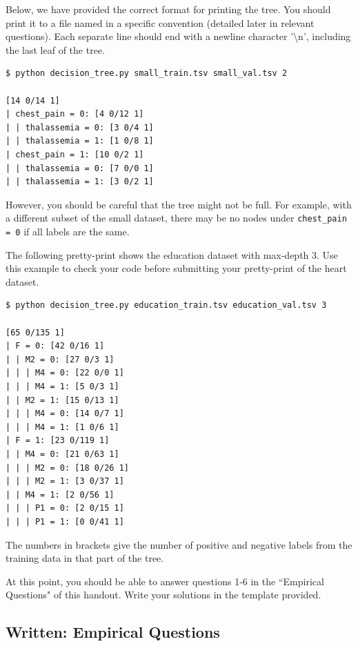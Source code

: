 Below, we have provided the correct format for printing the tree. You should print it to a file named in a specific convention (detailed later in relevant questions). Each separate line should end with a newline character '\textbackslash n', including the last leaf of the tree.

\begin{lstlisting}[language=Shell]
$ python decision_tree.py small_train.tsv small_val.tsv 2

[14 0/14 1]
| chest_pain = 0: [4 0/12 1]
| | thalassemia = 0: [3 0/4 1]
| | thalassemia = 1: [1 0/8 1]
| chest_pain = 1: [10 0/2 1]
| | thalassemia = 0: [7 0/0 1]
| | thalassemia = 1: [3 0/2 1]
\end{lstlisting}

However, you should be careful that the tree might not be full. For example, with a different subset of the small dataset, there may be no nodes under \lstinline{chest_pain = 0} if all labels are the same.

The following pretty-print shows the education dataset with max-depth 3.  Use this example to check your code before submitting your pretty-print of the heart dataset.

\begin{lstlisting}[language=Shell]
$ python decision_tree.py education_train.tsv education_val.tsv 3

[65 0/135 1]
| F = 0: [42 0/16 1]
| | M2 = 0: [27 0/3 1]
| | | M4 = 0: [22 0/0 1]
| | | M4 = 1: [5 0/3 1]
| | M2 = 1: [15 0/13 1]
| | | M4 = 0: [14 0/7 1]
| | | M4 = 1: [1 0/6 1]
| F = 1: [23 0/119 1]
| | M4 = 0: [21 0/63 1]
| | | M2 = 0: [18 0/26 1]
| | | M2 = 1: [3 0/37 1]
| | M4 = 1: [2 0/56 1]
| | | P1 = 0: [2 0/15 1]
| | | P1 = 1: [0 0/41 1]
\end{lstlisting}

The numbers in brackets give the number of positive and negative labels from the training data in that part of the tree.

\begin{notebox}
At this point, you should be able to answer questions 1-6 in the ``Empirical Questions" of this handout.  Write your solutions in the template provided. 
\end{notebox}


\subsection{Written: Empirical Questions}
\label{sec:empirical questions}

